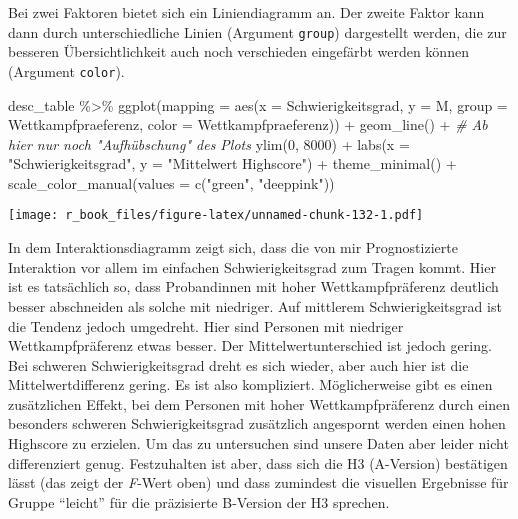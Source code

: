 \documentclass[
]{book}
\newenvironment{Shaded}{\begin{snugshade}}{\end{snugshade}}
\newcommand{\AttributeTok}[1]{\textcolor[rgb]{0.77,0.63,0.00}{#1}}
\newcommand{\CommentTok}[1]{\textcolor[rgb]{0.56,0.35,0.01}{\textit{#1}}}
\newcommand{\DecValTok}[1]{\textcolor[rgb]{0.00,0.00,0.81}{#1}}
\newcommand{\FunctionTok}[1]{\textcolor[rgb]{0.00,0.00,0.00}{#1}}
\newcommand{\NormalTok}[1]{#1}
\newcommand{\SpecialCharTok}[1]{\textcolor[rgb]{0.00,0.00,0.00}{#1}}
\newcommand{\StringTok}[1]{\textcolor[rgb]{0.31,0.60,0.02}{#1}}
\begin{document}
Bei zwei Faktoren bietet sich ein Liniendiagramm an. Der zweite Faktor kann dann durch unterschiedliche Linien (Argument \texttt{group}) dargestellt werden, die zur besseren Übersichtlichkeit auch noch verschieden eingefärbt werden können (Argument \texttt{color}).

\begin{Shaded}
\begin{Highlighting}[]
\NormalTok{desc\_table }\SpecialCharTok{\%\textgreater{}\%} 
  \FunctionTok{ggplot}\NormalTok{(}\AttributeTok{mapping =} \FunctionTok{aes}\NormalTok{(}\AttributeTok{x =}\NormalTok{ Schwierigkeitsgrad, }\AttributeTok{y =}\NormalTok{ M, }
                       \AttributeTok{group =}\NormalTok{ Wettkampfpraeferenz, }\AttributeTok{color =}\NormalTok{ Wettkampfpraeferenz)) }\SpecialCharTok{+}       
  \FunctionTok{geom\_line}\NormalTok{() }\SpecialCharTok{+} 
  \CommentTok{\# Ab hier nur noch "Aufhübschung" des Plots}
  \FunctionTok{ylim}\NormalTok{(}\DecValTok{0}\NormalTok{, }\DecValTok{8000}\NormalTok{) }\SpecialCharTok{+}
  \FunctionTok{labs}\NormalTok{(}\AttributeTok{x =} \StringTok{"Schwierigkeitsgrad"}\NormalTok{, }
       \AttributeTok{y =} \StringTok{"Mittelwert Highscore"}\NormalTok{) }\SpecialCharTok{+} 
  \FunctionTok{theme\_minimal}\NormalTok{() }\SpecialCharTok{+}
  \FunctionTok{scale\_color\_manual}\NormalTok{(}\AttributeTok{values =} \FunctionTok{c}\NormalTok{(}\StringTok{"green"}\NormalTok{, }\StringTok{"deeppink"}\NormalTok{))}
\end{Highlighting}
\end{Shaded}

\texttt{[image: r\_book\_files/figure-latex/unnamed-chunk-132-1.pdf]}

In dem Interaktionsdiagramm zeigt sich, dass die von mir Prognostizierte Interaktion vor allem im einfachen Schwierigkeitsgrad zum Tragen kommt. Hier ist es tatsächlich so, dass Probandinnen mit hoher Wettkampfpräferenz deutlich besser abschneiden als solche mit niedriger. Auf mittlerem Schwierigkeitsgrad ist die Tendenz jedoch umgedreht. Hier sind Personen mit niedriger Wettkampfpräferenz etwas besser. Der Mittelwertunterschied ist jedoch gering. Bei schweren Schwierigkeitsgrad dreht es sich wieder, aber auch hier ist die Mittelwertdifferenz gering. Es ist also kompliziert. Möglicherweise gibt es einen zusätzlichen Effekt, bei dem Personen mit hoher Wettkampfpräferenz durch einen besonders schweren Schwierigkeitsgrad zusätzlich angespornt werden einen hohen Highscore zu erzielen. Um das zu untersuchen sind unsere Daten aber leider nicht differenziert genug. Festzuhalten ist aber, dass sich die H3 (A-Version) bestätigen lässt (das zeigt der \emph{F}-Wert oben) und dass zumindest die visuellen Ergebnisse für Gruppe ``leicht'' für die präzisierte B-Version der H3 sprechen.
\end{document}
